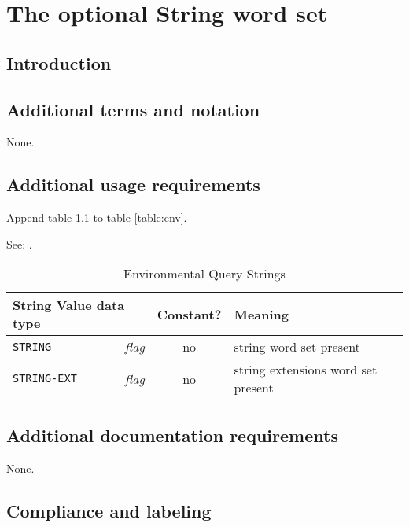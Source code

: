 \chapter{The optional String word set} %

\section{Introduction} %

\section{Additional terms and notation} %

None.

\section{Additional usage requirements} %

Append table \ref{string:env} to table \ref{table:env}.

See: .

\begin{table}[ht]
  \begin{center}
	\caption{Environmental Query Strings}
	\label{string:env}
	\begin{tabular}{p{9em}rcp{}}
		\hline\hline
		\multicolumn{2}{l}{String \hfill Value data type} & Constant? & Meaning \\
		\hline
		\texttt{STRING}		& \emph{flag}	& no	&
			string word set present \\
		\texttt{STRING-EXT}	& \emph{flag}	& no	&
			string extensions word set present \\
		\hline\hline
	\end{tabular}
  \end{center}
\end{table}

\section{Additional documentation requirements} %

None.

\section{Compliance and labeling} %

